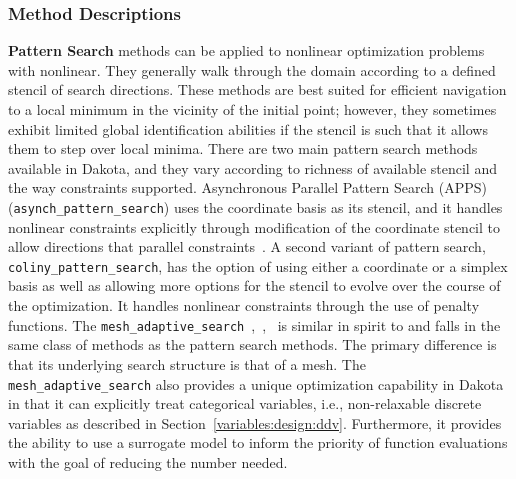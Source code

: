 \subsubsection{Method Descriptions}
\label{opt:methods:gradientfree:local:descriptions}

{\bf Pattern Search} methods can be applied to nonlinear optimization
problems with nonlinear.  They generally walk through the domain
according to a defined stencil of search directions.  These methods
are best suited for efficient navigation to a local minimum in the
vicinity of the initial point; however, they sometimes exhibit limited
global identification abilities if the stencil is such that it allows
them to step over local minima.  There are two main pattern search
methods available in Dakota, and they vary according to richness of
available stencil and the way constraints supported.  Asynchronous
Parallel Pattern Search (APPS)~\cite{GrKo06}
(\texttt{asynch\_pattern\_search}) uses the coordinate basis as its
stencil, and it handles nonlinear constraints explicitly through
modification of the coordinate stencil to allow directions that
parallel constraints~\cite{GrKo07}.  A second variant of pattern
search, \texttt{coliny\_pattern\_search}, has the option of using
either a coordinate or a simplex basis as well as allowing more
options for the stencil to evolve over the course of the optimization.
It handles nonlinear constraints through the use of penalty functions.
The
\texttt{mesh\_adaptive\_search}~\cite{AuLeTr09a},~\cite{Nomad},~\cite{Le2011a}
is similar in spirit to and falls in the same class of methods as the
pattern search methods.  The primary difference is that its underlying
search structure is that of a mesh.  The
\texttt{mesh\_adaptive\_search} also provides a unique optimization
capability in Dakota in that it can explicitly treat categorical
variables, i.e., non-relaxable discrete variables as described in
Section~\ref{variables:design:ddv}.  Furthermore, it provides the
ability to use a surrogate model to inform the priority of function
evaluations with the goal of reducing the number needed.

